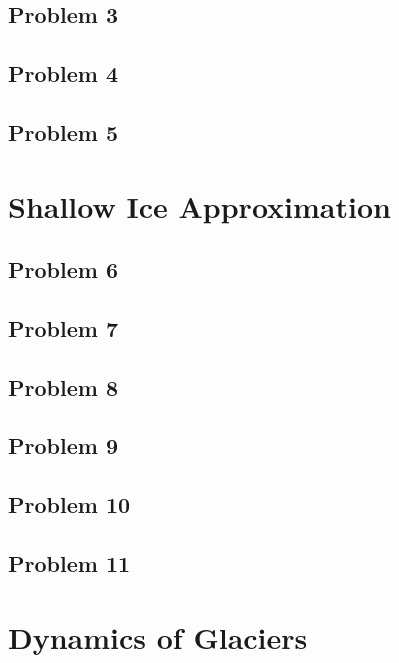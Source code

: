 \documentclass[11pt,a4paper,twoside,norsk]{article}
\begin{document}
\subsection*{Problem 3}


\subsection*{Problem 4}


\subsection*{Problem 5}


\section{Shallow Ice Approximation}


\subsection*{Problem 6}


\subsection*{Problem 7}


\subsection*{Problem 8}


\subsection*{Problem 9}
 

\subsection*{Problem 10}


\subsection*{Problem 11}


\section{Dynamics of Glaciers}
\end{document}
